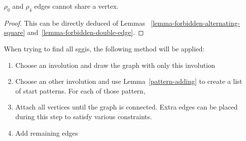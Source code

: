 \begin{corollary}
  \label{0-4-no-share}
  $\rho_0$ and $\rho_4$ edges cannot share a vertex.
\end{corollary}

\begin{proof}
  This can be directly deduced of Lemmas ~\ref{lemma-forbidden-alternating-square} and~\ref{lemma-forbidden-double-edge}.
\end{proof}

\begin{method}
  \label{method}
  When trying to find all sggis, the following method will be applied:

  \begin{enumerate}
    \item Choose an involution and draw the graph with only this involution
    \item Choose an other involution and use Lemma~\ref{pattern-adding} to create a list of start patterns. For each of those pattern,
    \item Attach all vertices until the graph is connected. Extra edges can be placed during this step to satisfy various constraints.
    \item Add remaining edges
  \end{enumerate}


\end{method}
